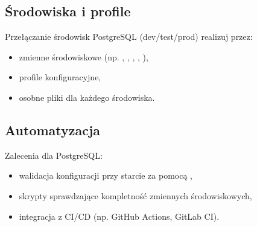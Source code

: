 \documentclass[letterpaper,10pt,polish]{sphinxmanual}
\begin{document}
\sphinxAtStartPar
{}

\begin{sphinxVerbatim}[commandchars=\\\{\}]
\end{sphinxVerbatim}


\subsection{Środowiska i profile}
\label{\detokenize{rozdzia_u0142_2/rozdzia_u0142_22/index:srodowiska-i-profile}}
\sphinxAtStartPar
Przełączanie środowisk PostgreSQL (dev/test/prod) realizuj przez:
\begin{itemize}
\item {} 
\sphinxAtStartPar
zmienne środowiskowe (np. , , , , ),

\item {} 
\sphinxAtStartPar
profile konfiguracyjne,

\item {} 
\sphinxAtStartPar
osobne pliki  dla każdego środowiska.

\end{itemize}


\subsection{Automatyzacja}
\label{\detokenize{rozdzia_u0142_2/rozdzia_u0142_22/index:automatyzacja}}
\sphinxAtStartPar
Zalecenia dla PostgreSQL:
\begin{itemize}
\item {} 
\sphinxAtStartPar
walidacja konfiguracji przy starcie za pomocą ,

\item {} 
\sphinxAtStartPar
skrypty sprawdzające kompletność zmiennych środowiskowych,

\item {} 
\sphinxAtStartPar
integracja z CI/CD (np. GitHub Actions, GitLab CI).

\end{itemize}
\end{document}
